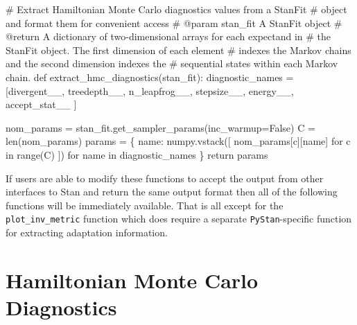 \documentclass[
  letterpaper,
  DIV=11,
  numbers=noendperiod]{scrartcl}
\newenvironment{Shaded}{\begin{snugshade}}{\end{snugshade}}
\newcommand{\BuiltInTok}[1]{\textcolor[rgb]{0.00,0.23,0.31}{#1}}
\newcommand{\CommentTok}[1]{\textcolor[rgb]{0.37,0.37,0.37}{#1}}
\newcommand{\ControlFlowTok}[1]{\textcolor[rgb]{0.00,0.23,0.31}{#1}}
\newcommand{\KeywordTok}[1]{\textcolor[rgb]{0.00,0.23,0.31}{#1}}
\newcommand{\NormalTok}[1]{\textcolor[rgb]{0.00,0.23,0.31}{#1}}
\newcommand{\OperatorTok}[1]{\textcolor[rgb]{0.37,0.37,0.37}{#1}}
\newcommand{\StringTok}[1]{\textcolor[rgb]{0.13,0.47,0.30}{#1}}
\newcommand{\VariableTok}[1]{\textcolor[rgb]{0.07,0.07,0.07}{#1}}
\begin{document}
\begin{Shaded}
\begin{Highlighting}[]
\CommentTok{\# Extract Hamiltonian Monte Carlo diagnostics values from a StanFit}
\CommentTok{\# object and format them for convenient access}
\CommentTok{\# @param stan\_fit A StanFit object}
\CommentTok{\# @return A dictionary of two{-}dimensional arrays for each expectand in }
\CommentTok{\#         the StanFit object.  The first dimension of each element }
\CommentTok{\#         indexes the Markov chains and the second dimension indexes the }
\CommentTok{\#         sequential states within each Markov chain. }
\KeywordTok{def}\NormalTok{ extract\_hmc\_diagnostics(stan\_fit):}
\NormalTok{  diagnostic\_names }\OperatorTok{=}\NormalTok{ [}\StringTok{\textquotesingle{}divergent\_\_\textquotesingle{}}\NormalTok{, }\StringTok{\textquotesingle{}treedepth\_\_\textquotesingle{}}\NormalTok{, }\StringTok{\textquotesingle{}n\_leapfrog\_\_\textquotesingle{}}\NormalTok{, }
                      \StringTok{\textquotesingle{}stepsize\_\_\textquotesingle{}}\NormalTok{, }\StringTok{\textquotesingle{}energy\_\_\textquotesingle{}}\NormalTok{, }\StringTok{\textquotesingle{}accept\_stat\_\_\textquotesingle{}}\NormalTok{ ]}
  
\NormalTok{  nom\_params }\OperatorTok{=}\NormalTok{ stan\_fit.get\_sampler\_params(inc\_warmup}\OperatorTok{=}\VariableTok{False}\NormalTok{)}
\NormalTok{  C }\OperatorTok{=} \BuiltInTok{len}\NormalTok{(nom\_params)}
\NormalTok{  params }\OperatorTok{=}\NormalTok{ \{ name: numpy.vstack([ nom\_params[c][name] }
                                  \ControlFlowTok{for}\NormalTok{ c }\KeywordTok{in} \BuiltInTok{range}\NormalTok{(C) ])}
           \ControlFlowTok{for}\NormalTok{ name }\KeywordTok{in}\NormalTok{ diagnostic\_names \}}
  \ControlFlowTok{return}\NormalTok{ params}
\end{Highlighting}
\end{Shaded}

If users are able to modify these functions to accept the output from
other interfaces to Stan and return the same output format then all of
the following functions will be immediately available. That is all
except for the \texttt{plot\_inv\_metric} function which does require a
separate \texttt{PyStan}-specific function for extracting adaptation
information.

\hypertarget{hamiltonian-monte-carlo-diagnostics}{%
\section{Hamiltonian Monte Carlo
Diagnostics}\label{hamiltonian-monte-carlo-diagnostics}}
\end{document}
